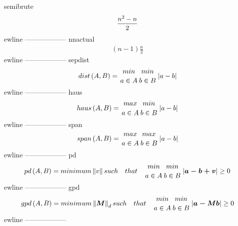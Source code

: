 \newline
semibrute\newline
\begin{equation*}
 \begin{split}
 {{{n^2} - n} \over 2}\end{split}
 \end{equation*}
ewline
------------------
\newline
nnactual\newline
\begin{equation*}
 \begin{split}
 \left( {n - 1} \right)\frac{n}{2}\end{split}
 \end{equation*}
ewline
------------------
\newline
sepdist\newline
\begin{equation*}
 \begin{split}
 dist\left( A,B \right) = {min \atop {a \in A }} {min \atop {b \in B}}\left| a-b \right|\end{split}
 \end{equation*}
ewline
------------------
\newline
haus\newline
\begin{equation*}
 \begin{split}
 haus\left( A,B \right) = {max \atop {a \in A }} {min \atop {b \in B}} \left| a-b \right|\end{split}
 \end{equation*}
ewline
------------------
\newline
span\newline
\begin{equation*}
 \begin{split}
 span\left( A,B \right) = {max \atop {a \in A }} {max \atop {b \in B}} \left| a-b \right|\end{split}
 \end{equation*}
ewline
------------------
\newline
pd\newline
\begin{equation*}
 \begin{split}
 pd\left( A,B \right) = minimum \left\Vert v \right\Vert such \quad  that\quad  {min \atop {a \in A }} {min \atop {b \in B}} \left| \boldsymbol{a-b+v} \right|\geq0\end{split}
 \end{equation*}
ewline
------------------
\newline
gpd\newline
\begin{equation*}
 \begin{split}
 gpd\left( A,B \right) = minimum \left\Vert \boldsymbol{M} \right\Vert_d such \quad  that\quad  {min \atop {a \in A }} {min \atop {b \in B}} \left| \boldsymbol{a-Mb} \right|\geq0\end{split}
 \end{equation*}
ewline
------------------
